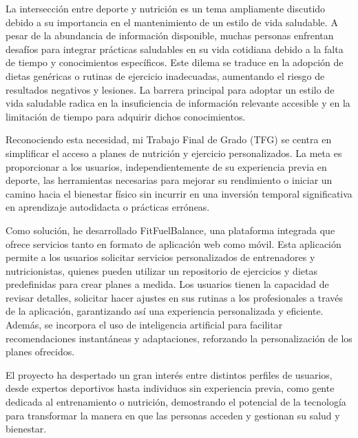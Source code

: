 La intersección entre deporte y nutrición es un tema ampliamente discutido debido a su importancia en el mantenimiento de un estilo de vida saludable. A pesar de la abundancia de información disponible, muchas personas enfrentan desafíos para integrar prácticas saludables en su vida cotidiana debido a la falta de tiempo y conocimientos específicos. Este dilema se traduce en la adopción de dietas genéricas o rutinas de ejercicio inadecuadas, aumentando el riesgo de resultados negativos y lesiones. La barrera principal para adoptar un estilo de vida saludable radica en la insuficiencia de información relevante accesible y en la limitación de tiempo para adquirir dichos conocimientos.

Reconociendo esta necesidad, mi Trabajo Final de Grado (TFG) se centra en simplificar el acceso a planes de nutrición y ejercicio personalizados. La meta es proporcionar a los usuarios, independientemente de su experiencia previa en deporte, las herramientas necesarias para mejorar su rendimiento o iniciar un camino hacia el bienestar físico sin incurrir en una inversión temporal significativa en aprendizaje autodidacta o prácticas erróneas.

Como solución, he desarrollado FitFuelBalance, una plataforma integrada que ofrece servicios tanto en formato de aplicación web como móvil. Esta aplicación permite a los usuarios solicitar servicios personalizados de entrenadores y nutricionistas, quienes pueden utilizar un repositorio de ejercicios y dietas predefinidas para crear planes a medida. Los usuarios tienen la capacidad de revisar detalles, solicitar hacer ajustes en sus rutinas a los profesionales a través de la aplicación, garantizando así una experiencia personalizada y eficiente. Además, se incorpora el uso de inteligencia artificial para facilitar recomendaciones instantáneas y adaptaciones, reforzando la personalización de los planes ofrecidos.

El proyecto ha despertado un gran interés entre distintos perfiles de usuarios, desde expertos deportivos hasta individuos sin experiencia previa, como gente dedicada al entrenamiento o nutrición, demostrando el potencial de la tecnología para transformar la manera en que las personas acceden y gestionan su salud y bienestar.





